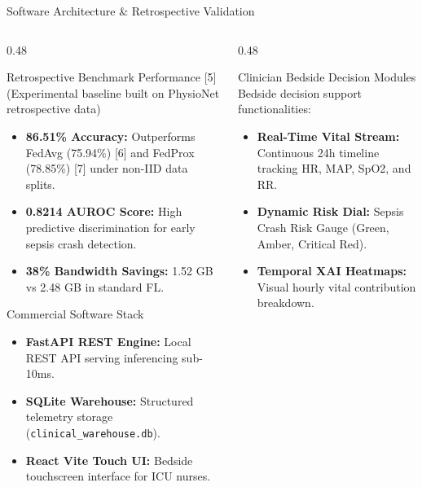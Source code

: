 \documentclass[aspectratio=169, 11pt]{beamer}
\begin{document}
\begin{frame}{Software Architecture \& Retrospective Validation}
    \begin{columns}[t]
        \begin{column}{0.48\textwidth}
            \begin{block}{\textcolor{neonCyan}{Retrospective Benchmark Performance [5]}}
                \tiny
                (Experimental baseline built on PhysioNet retrospective data)
                \begin{itemize}
                    \item \textbf{86.51\% Accuracy:} Outperforms FedAvg (75.94\%) [6] and FedProx (78.85\%) [7] under non-IID data splits.
                    \item \textbf{0.8214 AUROC Score:} High predictive discrimination for early sepsis crash detection.
                    \item \textbf{38\% Bandwidth Savings:} 1.52 GB vs 2.48 GB in standard FL.
                \end{itemize}
            \end{block}
            
            \begin{block}{\textcolor{neonTeal}{Commercial Software Stack}}
                \tiny
                \begin{itemize}
                    \item \textbf{FastAPI REST Engine:} Local REST API serving inferencing sub-10ms.
                    \item \textbf{SQLite Warehouse:} Structured telemetry storage (\texttt{clinical\_warehouse.db}).
                    \item \textbf{React Vite Touch UI:} Bedside touchscreen interface for ICU nurses.
                \end{itemize}
            \end{block}
        \end{column}
        
        \begin{column}{0.48\textwidth}
            \begin{block}{\textcolor{neonAmber}{Clinician Bedside Decision Modules}}
                \tiny
                Bedside decision support functionalities:
                \begin{itemize}
                    \item \textbf{Real-Time Vital Stream:} Continuous 24h timeline tracking HR, MAP, SpO2, and RR.
                    \item \textbf{Dynamic Risk Dial:} Sepsis Crash Risk Gauge (Green, Amber, Critical Red).
                    \item \textbf{Temporal XAI Heatmaps:} Visual hourly vital contribution breakdown.
                \end{itemize}
            \end{block}


\end{column}
\end{columns}
\end{frame}
\end{document}
